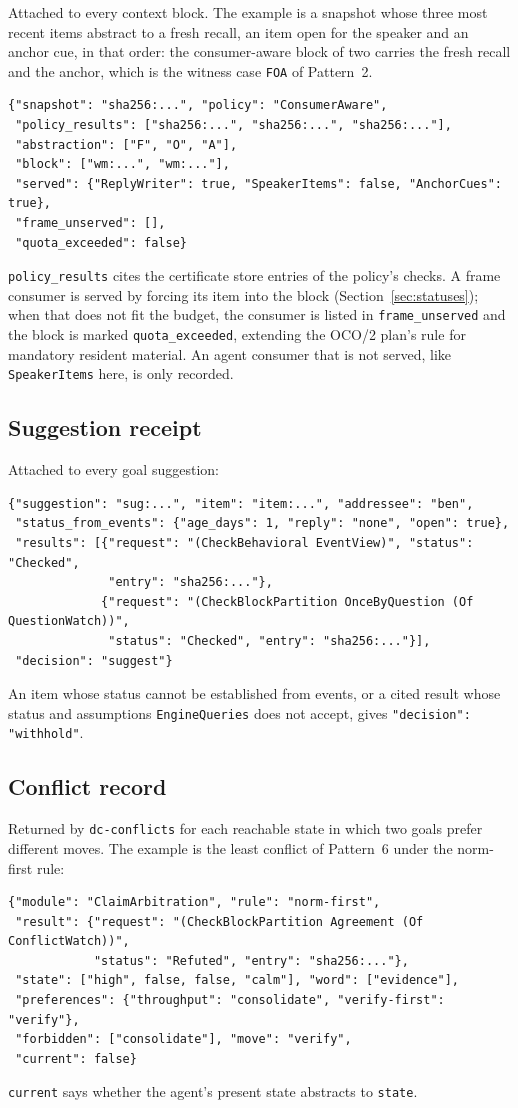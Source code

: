 \documentclass[11pt]{article}
\newcommand{\code}[1]{\texttt{#1}}
\theoremstyle{definition}
\theoremstyle{plain}
\begin{document}
Attached to every context block. The example is a snapshot whose three most recent items abstract
to a fresh recall, an item open for the speaker and an anchor cue, in that order: the
consumer-aware block of two carries the fresh recall and the anchor, which is the witness case
\code{FOA} of Pattern~2.
\begin{lstlisting}
{"snapshot": "sha256:...", "policy": "ConsumerAware",
 "policy_results": ["sha256:...", "sha256:...", "sha256:..."],
 "abstraction": ["F", "O", "A"],
 "block": ["wm:...", "wm:..."],
 "served": {"ReplyWriter": true, "SpeakerItems": false, "AnchorCues": true},
 "frame_unserved": [],
 "quota_exceeded": false}
\end{lstlisting}
\code{policy\_results} cites the certificate store entries of the policy's checks. A frame
consumer is served by forcing its item into the block (Section~\ref{sec:statuses}); when that does
not fit the budget, the consumer is listed in \code{frame\_unserved} and the block is marked
\code{quota\_exceeded}, extending the OCO/2 plan's rule for mandatory resident material. An agent
consumer that is not served, like
\code{SpeakerItems} here, is only recorded.

\subsection{Suggestion receipt}

Attached to every goal suggestion:
\begin{lstlisting}
{"suggestion": "sug:...", "item": "item:...", "addressee": "ben",
 "status_from_events": {"age_days": 1, "reply": "none", "open": true},
 "results": [{"request": "(CheckBehavioral EventView)", "status": "Checked",
              "entry": "sha256:..."},
             {"request": "(CheckBlockPartition OnceByQuestion (Of QuestionWatch))",
              "status": "Checked", "entry": "sha256:..."}],
 "decision": "suggest"}
\end{lstlisting}
An item whose status cannot be established from events, or a cited result whose status and
assumptions \code{EngineQueries} does not accept, gives \code{"decision": "withhold"}.

\subsection{Conflict record}

Returned by \code{dc-conflicts} for each reachable state in which two goals prefer different
moves. The example is the least conflict of Pattern~6 under the norm-first rule:
\begin{lstlisting}
{"module": "ClaimArbitration", "rule": "norm-first",
 "result": {"request": "(CheckBlockPartition Agreement (Of ConflictWatch))",
            "status": "Refuted", "entry": "sha256:..."},
 "state": ["high", false, false, "calm"], "word": ["evidence"],
 "preferences": {"throughput": "consolidate", "verify-first": "verify"},
 "forbidden": ["consolidate"], "move": "verify",
 "current": false}
\end{lstlisting}
\code{current} says whether the agent's present state abstracts to \code{state}.
\end{document}
